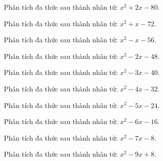\begin{bt}
	Phân tích đa thức sau thành nhân tử: $x^2 + 2 x - 80$.
\end{bt}
\begin{bt}
	Phân tích đa thức sau thành nhân tử: $x^2 + x - 72$.
\end{bt}
\begin{bt}
	Phân tích đa thức sau thành nhân tử: $x^2 - x - 56$.
\end{bt}
\begin{bt}
	Phân tích đa thức sau thành nhân tử: $x^2 - 2 x - 48$.
\end{bt}
\begin{bt}
	Phân tích đa thức sau thành nhân tử: $x^2 - 3 x - 40$.
\end{bt}
\begin{bt}
	Phân tích đa thức sau thành nhân tử: $x^2 - 4 x - 32$.
\end{bt}
\begin{bt}
	Phân tích đa thức sau thành nhân tử: $x^2 - 5 x - 24$.
\end{bt}
\begin{bt}
	Phân tích đa thức sau thành nhân tử: $x^2 - 6 x - 16$.
\end{bt}
\begin{bt}
	Phân tích đa thức sau thành nhân tử: $x^2 - 7 x - 8$.
\end{bt}
\begin{bt}
	Phân tích đa thức sau thành nhân tử: $x^2 - 9 x + 8$.
\end{bt}
